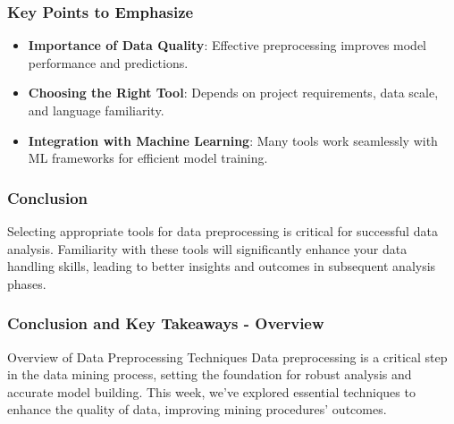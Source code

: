 \documentclass{beamer}
\begin{document}
\begin{frame}
    \frametitle{Key Points to Emphasize}
    \begin{itemize}
        \item \textbf{Importance of Data Quality}: Effective preprocessing improves model performance and predictions.
        \item \textbf{Choosing the Right Tool}: Depends on project requirements, data scale, and language familiarity.
        \item \textbf{Integration with Machine Learning}: Many tools work seamlessly with ML frameworks for efficient model training.
    \end{itemize}
\end{frame}

\begin{frame}
    \frametitle{Conclusion}
    Selecting appropriate tools for data preprocessing is critical for successful data analysis. Familiarity with these tools will significantly enhance your data handling skills, leading to better insights and outcomes in subsequent analysis phases.
\end{frame}

\begin{frame}[fragile]
    \frametitle{Conclusion and Key Takeaways - Overview}
    \begin{block}{Overview of Data Preprocessing Techniques}
        Data preprocessing is a critical step in the data mining process, setting the foundation for robust analysis and accurate model building.
        This week, we've explored essential techniques to enhance the quality of data, improving mining procedures' outcomes.
    \end{block}
\end{frame}
\end{document}

